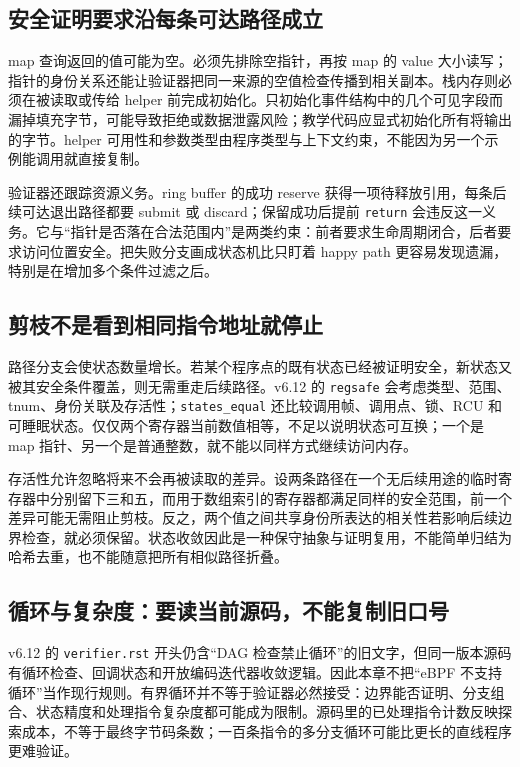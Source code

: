 \documentclass[UTF8,fontset=fandol,openany,11pt]{ctexbook}
\begin{document}
\subsection{安全证明要求沿每条可达路径成立}

map 查询返回的值可能为空。必须先排除空指针，再按 map 的 value 大小读写；指针的身份关系还能让验证器把同一来源的空值检查传播到相关副本。栈内存则必须在被读取或传给 helper 前完成初始化。只初始化事件结构中的几个可见字段而漏掉填充字节，可能导致拒绝或数据泄露风险；教学代码应显式初始化所有将输出的字节。helper 可用性和参数类型由程序类型与上下文约束，不能因为另一个示例能调用就直接复制。\cite{eb-verifier-doc}\cite{eb-verifier-code}


验证器还跟踪资源义务。ring buffer 的成功 reserve 获得一项待释放引用，每条后续可达退出路径都要 submit 或 discard；保留成功后提前 \texttt{return} 会违反这一义务。它与“指针是否落在合法范围内”是两类约束：前者要求生命周期闭合，后者要求访问位置安全。把失败分支画成状态机比只盯着 happy path 更容易发现遗漏，特别是在增加多个条件过滤之后。\cite{eb-ring-doc}\cite{eb-ring-code}\cite{eb-verifier-code}


\subsection{剪枝不是看到相同指令地址就停止}

路径分支会使状态数量增长。若某个程序点的既有状态已经被证明安全，新状态又被其安全条件覆盖，则无需重走后续路径。v6.12 的 \texttt{regsafe} 会考虑类型、范围、tnum、身份关联及存活性；\texttt{states\_\allowbreak{}equal} 还比较调用帧、调用点、锁、RCU 和可睡眠状态。仅仅两个寄存器当前数值相等，不足以说明状态可互换；一个是 map 指针、另一个是普通整数，就不能以同样方式继续访问内存。\cite{eb-verifier-code}


存活性允许忽略将来不会再被读取的差异。设两条路径在一个无后续用途的临时寄存器中分别留下三和五，而用于数组索引的寄存器都满足同样的安全范围，前一个差异可能无需阻止剪枝。反之，两个值之间共享身份所表达的相关性若影响后续边界检查，就必须保留。状态收敛因此是一种保守抽象与证明复用，不能简单归结为哈希去重，也不能随意把所有相似路径折叠。\cite{eb-verifier-code}


\subsection{循环与复杂度：要读当前源码，不能复制旧口号}

v6.12 的 \texttt{verifier.\allowbreak{}rst} 开头仍含“DAG 检查禁止循环”的旧文字，但同一版本源码有循环检查、回调状态和开放编码迭代器收敛逻辑。因此本章不把“eBPF 不支持循环”当作现行规则。有界循环并不等于验证器必然接受：边界能否证明、分支组合、状态精度和处理指令复杂度都可能成为限制。源码里的已处理指令计数反映探索成本，不等于最终字节码条数；一百条指令的多分支循环可能比更长的直线程序更难验证。\cite{eb-verifier-doc}\cite{eb-verifier-code}
\end{document}

